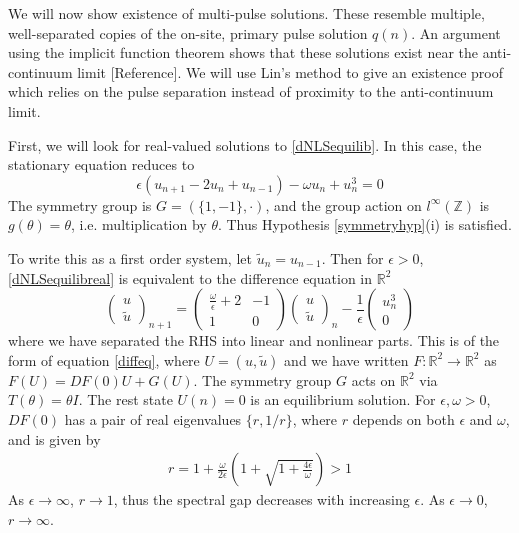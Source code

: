 \documentclass[12pt]{article}
\def\R{{\mathbb R}}
\def\Z{{\mathbb Z}}
\begin{document}
We will now show existence of multi-pulse solutions. These resemble multiple, well-separated copies of the on-site, primary pulse solution $q(n)$. An argument using the implicit function theorem shows that these solutions exist near the anti-continuum limit [Reference]. We will use Lin's method to give an existence proof which relies on the pulse separation instead of proximity to the anti-continuum limit.

First, we will look for real-valued solutions to \eqref{dNLSequilib}. In this case, the stationary equation reduces to
\begin{equation}\label{dNLSequilibreal}
\epsilon(u_{n+1} - 2 u_n + u_{n-1}) - \omega u_n + u_n^3 = 0
\end{equation}
The symmetry group is $G = (\{1, -1\}, \cdot)$, and the group action on $l^\infty(\Z)$ is $g(\theta) = \theta$, i.e. multiplication by $\theta$. Thus Hypothesis \eqref{symmetryhyp}(i) is satisfied.

To write this as a first order system, let $\tilde{u}_n = u_{n-1}$. Then for $\epsilon > 0$, \eqref{dNLSequilibreal} is equivalent to the difference equation in $\R^2$
\begin{equation}\label{dnlsdiffR2}
\begin{pmatrix}
u \\ \tilde{u}
\end{pmatrix}_{n+1} =
\begin{pmatrix}
\frac{\omega}{\epsilon} + 2 & -1 \\
1 & 0
\end{pmatrix}
\begin{pmatrix}
u \\ \tilde{u}
\end{pmatrix}_n
- \frac{1}{\epsilon} 
\begin{pmatrix}
u_n^3 \\ 0
\end{pmatrix}
\end{equation}
where we have separated the RHS into linear and nonlinear parts. This is of the form of equation \eqref{diffeq}, where $U = (u, \tilde{u})$ and we have written $F: \R^2 \rightarrow \R^2$ as $F(U) = DF(0) U + G(U)$. The symmetry group $G$ acts on $\R^2$ via $T(\theta) = \theta I$. The rest state $U(n) = 0$ is an equilibrium solution. For $\epsilon, \omega > 0$, $DF(0)$ has a pair of real eigenvalues $\{r, 1/r \}$, where $r$ depends on both $\epsilon$ and $\omega$, and is given by
\begin{align}\label{defr}
r = 1 + \frac{\omega}{2 \epsilon} \left( 1 + \sqrt{1 + \frac{4 \epsilon}{\omega}} \right) > 1
\end{align}
As $\epsilon \rightarrow \infty$, $r \rightarrow 1$, thus the spectral gap decreases with increasing $\epsilon$. As $\epsilon \rightarrow 0$, $r \rightarrow \infty$.
\end{document}
